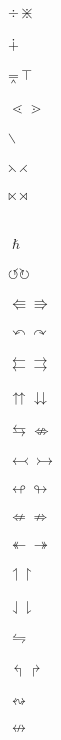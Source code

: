 \documentclass{article}
\begin{document}
$\div \divideontimes $\\\\
$\dotplus$\\\\
$\doublebarwedge \intercal$\\\\ 
$\lessdot \gtrdot $\\\\
$\smallsetminus$\\\\
$\leftthreetimes \rightthreetimes $\\\\
$\ltimes \rtimes $\\\\
\\
$\hslash$\\\\
$\circlearrowleft \circlearrowright$\\\\
$\Lleftarrow \Rrightarrow$\\\\
$\curvearrowleft \curvearrowright$\\\\
$\leftleftarrows \rightrightarrows$\\\\
$\upuparrows \downdownarrows$\\\\
$\leftrightarrows \nLeftrightarrow$\\\\
$\leftarrowtail \rightarrowtail$\\\\
$\looparrowleft \looparrowright$\\\\
$\nLeftarrow \nRightarrow$\\\\
$\twoheadleftarrow \twoheadrightarrow$\\\\
$\upharpoonleft \upharpoonright$\\\\
$\downharpoonleft \downharpoonright$\\\\
$\leftrightharpoons$\\\\
$\Lsh \Rsh$\\\\
$\leftrightsquigarrow$\\\\
$\nleftrightarrow$\\\\
\end{document}
